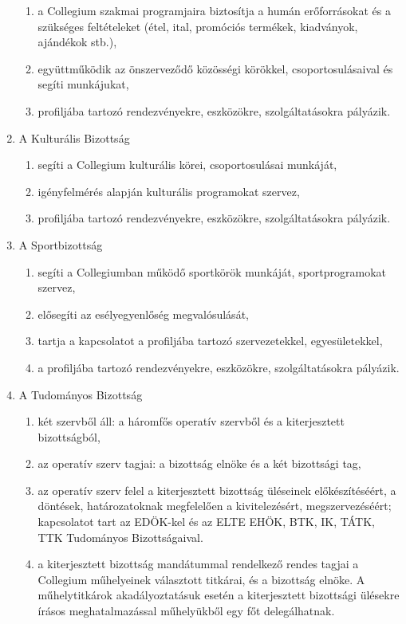 \documentclass{../styles/rulebook}
\begin{document}
\begin{enumerate}
\begin{enumerate}
		\item a Collegium szakmai programjaira biztosítja a humán erőforrásokat és a szükséges feltételeket (étel, ital, promóciós termékek, kiadványok, ajándékok stb.),
		\item együttműködik az önszerveződő közösségi körökkel, csoportosulásaival és segíti munkájukat,
		\item profiljába tartozó rendezvényekre, eszközökre, szolgáltatásokra pályázik.
	\end{enumerate}
	\item A Kulturális Bizottság
	\begin{enumerate}
		\item segíti a Collegium kulturális körei, csoportosulásai munkáját,
		\item igényfelmérés alapján kulturális programokat szervez,
		\item profiljába tartozó rendezvényekre, eszközökre, szolgáltatásokra pályázik.
	\end{enumerate}
	\item A Sportbizottság
	\begin{enumerate}
		\item segíti a Collegiumban működő sportkörök munkáját, sportprogramokat szervez,
		\item elősegíti az esélyegyenlőség megvalósulását,
		\item tartja a kapcsolatot a profiljába tartozó szervezetekkel, egyesületekkel,
		\item a profiljába tartozó rendezvényekre, eszközökre, szolgáltatásokra pályázik.
	\end{enumerate}
	\item A Tudományos Bizottság
	\begin{enumerate}
		\item két szervből áll: a háromfős operatív szervből és a kiterjesztett bizottságból,
		\item az operatív szerv tagjai: a bizottság elnöke és a két bizottsági tag,
		\item az operatív szerv felel a kiterjesztett bizottság üléseinek előkészítéséért, a döntések, határozatoknak megfelelően a kivitelezésért, megszervezéséért; kapcsolatot tart az EDÖK-kel és az ELTE EHÖK, BTK, IK, TÁTK, TTK Tudományos Bizottságaival.
		\item a kiterjesztett bizottság mandátummal rendelkező rendes tagjai a Collegium műhelyeinek választott titkárai, és a bizottság elnöke. A műhelytitkárok akadályoztatásuk esetén a kiterjesztett bizottsági ülésekre írásos meghatalmazással műhelyükből egy főt delegálhatnak.

\end{enumerate}
\end{enumerate}
\end{document}
